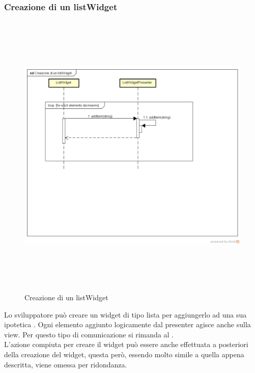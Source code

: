 \newpage

\subsubsection{Creazione di un listWidget}

\label{Click di un bottone}
\begin{figure}[H]
	\centering
	\includegraphics[width=16cm, height=14cm]{Sezioni/Diagrammi/SDK/Creazione di un listWidget.png}
	\caption{Creazione di un listWidget}
\end{figure}

Lo sviluppatore può creare un widget di tipo lista per aggiungerlo ad una sua ipotetica . Ogni elemento aggiunto logicamente dal presenter agisce anche sulla view. Per questo tipo di comunicazione si rimanda al  . \\
L'azione compiuta per creare il widget può essere anche effettuata a posteriori della creazione del widget, questa però, essendo molto simile a quella appena descritta, viene omessa per ridondanza.

\newpage

